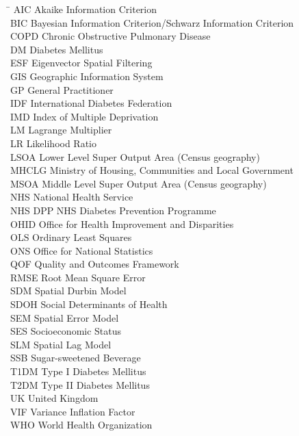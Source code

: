 \begin{Acronyms}
\begin{tabbing}
\hspace{3cm} \= \kill
AIC \> Akaike Information Criterion \\
BIC \> Bayesian Information Criterion/Schwarz Information Criterion \\
COPD \> Chronic Obstructive Pulmonary Disease \\
DM \> Diabetes Mellitus \\
ESF \> Eigenvector Spatial Filtering \\
GIS \> Geographic Information System \\
GP \> General Practitioner \\
IDF \> International Diabetes Federation \\
IMD \> Index of Multiple Deprivation \\
LM \> Lagrange Multiplier \\
LR \> Likelihood Ratio \\
LSOA \> Lower Level Super Output Area (Census geography) \\
MHCLG \> Ministry of Housing, Communities and Local Government \\
MSOA \> Middle Level Super Output Area (Census geography) \\
NHS \> National Health Service \\
NHS DPP \> NHS Diabetes Prevention Programme \\
OHID \> Office for Health Improvement and Disparities \\
OLS \> Ordinary Least Squares \\
ONS \> Office for National Statistics \\
QOF \> Quality and Outcomes Framework \\
RMSE \> Root Mean Square Error \\
SDM \> Spatial Durbin Model \\
SDOH \> Social Determinants of Health \\
SEM \> Spatial Error Model \\
SES \> Socioeconomic Status \\
SLM \> Spatial Lag Model \\
SSB \> Sugar-sweetened Beverage \\
T1DM \> Type I Diabetes Mellitus \\
T2DM \> Type II Diabetes Mellitus \\
UK \> United Kingdom \\
VIF \> Variance Inflation Factor \\
WHO \> World Health Organization \\
\end{tabbing}

\end{Acronyms}
